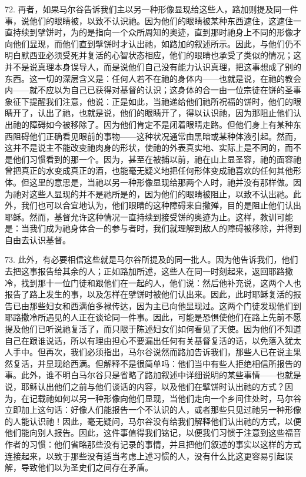 72. 再者，如果马尔谷告诉我们主以另一种形像显现给这些人，路加则提及同一件事，说他们的眼睛被，以致不认识祂。因为他们的眼睛被某种东西遮住，这遮住一直持续到擘饼时，为的是指向一个众所周知的奥迹，直到那时祂身上不同的形像才向他们显现，而他们直到擘饼时才认出祂，如路加的叙述所示。因此，与他们仍不明白默西亚必须受死并复活的心智状态相应，他们的眼睛也承受了类似的情况；这并不是说真理本身误导人，而是说他们自己没有能力认识真理，把这事想成了别的东西。这一切的深层含义是：任何人若不在祂的身体内——也就是说，在祂的教会内——就不应以为自己已获得对基督的认识；这身体的合一由一位宗徒在饼的圣事象征下提醒我们注意，他说：正是如此，当祂递给他们祂所祝福的饼时，他们的眼睛开了，认出了祂，也就是说，他们的眼睛开了，得以认识祂，因为那阻止他们认出祂的障碍如今被移除了。因为他们肯定不是闭着眼睛走路。但他们身上有某种东西阻碍他们正确看见眼前的事物——这种状况通常由黑暗或某种体液引起。然而，这并不是说主不能改变祂肉身的形状，使祂的外表真实地、实际上是不同的，而不是他们习惯看到的那一个。因为，甚至在被捕以前，祂在山上显圣容，祂的面容祂曾把真正的水变成真正的酒，也能毫无疑义地把任何形体变成祂喜欢的任何其他形体。但这里的意思是，当祂以另一种形像显现给那两个人时，祂并没有那样做。因为祂对这些人显现的并不是祂所是的，因为他们的眼睛被阻止，以致不认出祂。此外，我们也可以合宜地认为，他们眼睛的这种障碍来自撒殚，目的是阻止他们认出耶稣。然而，基督允许这种情况一直持续到接受饼的奥迹为止。这样，教训可能是：当我们成为祂身体合一的参与者时，我们就理解到敌人的障碍被移除，并得到自由去认识基督。\par

73. 此外，有必要相信这些就是马尔谷所提及的同一批人。因为他告诉我们，他们去把这事报告给其余的人；正如路加所述，这些人在同一时刻起来，返回耶路撒冷，找到那十一位门徒和跟他们在一起的人，他们说：然后他补充说，这两个人也报告了路上发生的事，以及怎样在擘饼时被他们认出来。因此，此时耶稣复活的报告已由那些妇女和西满伯多禄传达，因为主已向他显现过。这两个门徒发现他们到耶路撒冷所遇见的人正在谈论同一件事。因此，可能是恐惧使他们在路上先前不愿提及他们已听说祂复活了，而只限于陈述妇女们如何看见了天使。因为他们不知道自己在跟谁说话，所以有理由担心不要漏出任何有关基督复活的话，以免落入犹太人手中。但再次，我们必须指出，马尔谷说然而路加告诉我们，那些人已在说主果然复活，并显现给西满。但解释不是很简单吗：他们当中有些人拒绝相信所报告的事。此外，谁不明白马尔谷只是省略了路加叙述中详细说明的某些事情——也就是说，耶稣认出他们之前与他们谈话的内容，以及他们在擘饼时认出祂的方式？因为，在记载祂如何以另一种形像向他们显现，当他们走向一个乡间住处时，马尔谷立即加上这句话：好像人们能报告一个不认识的人，或者那些只见过祂另一种形像的人能认识祂！因此，毫无疑问，马尔谷没有给我们解释他们认出祂的方式，以便他们能向别人报告。因此，这件事值得我们铭记，以便我们习惯于注意到这些福音作者的习惯：他们省略那些没有记录的事情，并且把他们叙述的事实以这样的方式连接起来，以致于那些没有适当考虑上述习惯的人，没有什么比这更容易引起误解，导致他们以为圣史们之间存在矛盾。\par

